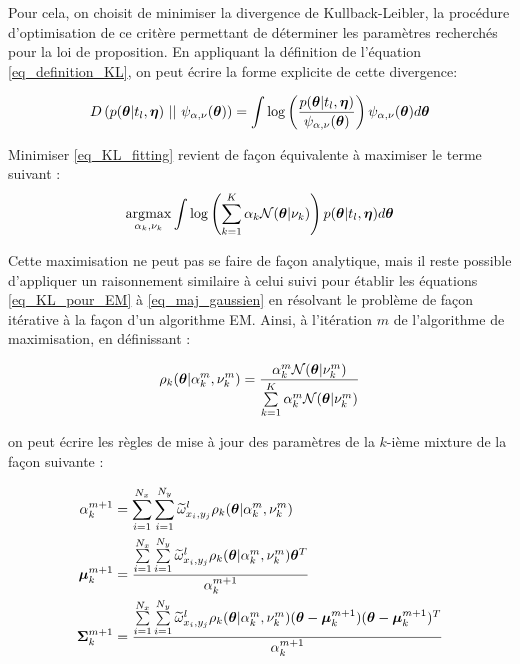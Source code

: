 Pour cela, on choisit de minimiser la divergence de Kullback-Leibler, la procédure d'optimisation de ce critère permettant de déterminer les paramètres recherchés pour la loi de proposition. En appliquant la définition de l'équation \eqref{eq_definition_KL}, on peut écrire la forme explicite de cette divergence: 

\begin{equation}
D\left(p({\bm{\theta}}|t_l,{\bm{\eta}}) ~ || ~ \psi_{\alpha, \nu}({\bm{\theta}})\right) = \int \log \left(\dfrac{p({\bm{\theta}}|t_l,{\bm{\eta}})}{ \psi_{\alpha, \nu}({\bm{\theta}})}\right) \psi_{\alpha, \nu}({\bm{\theta}}) d{\bm{\theta}}
\label{eq_KL_fitting}
\end{equation}

Minimiser \eqref{eq_KL_fitting} revient de façon équivalente à maximiser le terme suivant : 
\begin{equation}
\operatorname*{\arg\!\max}_{\alpha_k, \nu_k} \int \log \left(\sum\limits_{k=1}^K \alpha_k \mathcal{N}({\bm{\theta}} | \nu_k) \right)p({\bm{\theta}}|t_l,{\bm{\eta}}) d{\bm{\theta}}
\end{equation}

Cette maximisation ne peut pas se faire de façon analytique, mais il reste possible d'appliquer un raisonnement similaire à celui suivi pour établir les équations \eqref{eq_KL_pour_EM} à  \eqref{eq_maj_gaussien} en résolvant le problème de façon itérative à la façon d'un algorithme EM. Ainsi, à l'itération $m$ de l'algorithme de maximisation, en définissant : 

\begin{equation}
\rho_k ({\bm{\theta}} | \alpha_k^m,\nu_k^m) = \dfrac{\alpha_k^m \mathcal{N}({\bm{\theta}}|\nu_k^m)}{\sum\limits_{k=1}^K \alpha_k^m \mathcal{N}({\bm{\theta}}|\nu_k^m)}
\end{equation}

on peut écrire les règles de mise à jour des paramètres de la $k$-ième mixture de la façon suivante : 

\begin{equation}
\begin{split}
\alpha_k^{m+1} &= \sum\limits_{i=1}^{N_x} \sum\limits_{i=1}^{N_y} {\widetilde{\omega}_{x_i, y_j}^l} \rho_k ({\bm{\theta}} | \alpha_k^m,\nu_k^m) \\
{\bm{\mu}}_k^{m+1} &= \dfrac{\sum\limits_{i=1}^{N_x} \sum\limits_{i=1}^{N_y} {\widetilde{\omega}_{x_i,y_j}^l} \rho_k ({\bm{\theta}} | \alpha_k^m,\nu_k^m) {\bm{\theta}}^T}{\alpha_k^{m+1}} \\
{\bm{\Sigma}}_k^{m+1} &= \dfrac{\sum\limits_{i=1}^{N_x} \sum\limits_{i=1}^{N_y} {\widetilde{\omega}_{x_i,y_j}^l} \rho_k ({\bm{\theta}} | \alpha_k^m,\nu_k^m) ({\bm{\theta}} - {\bm{\mu}}_k^{m+1} )({\bm{\theta}} - {\bm{\mu}}_k^{m+1} )^T}{\alpha_k^{m+1}}
\end{split}
\end{equation}

